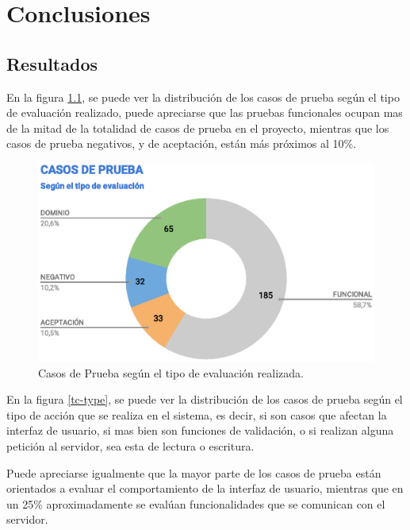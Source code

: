 \chapter{Conclusiones}

\section{Resultados}
En la figura \ref{tc-tests}, se puede ver la distribución de los casos de prueba
según el tipo de evaluación realizado, puede apreciarse que las pruebas
funcionales ocupan mas de la mitad de la totalidad de casos de prueba en el
proyecto, mientras que los casos de prueba negativos, y de aceptación, están más
próximos al 10\%.

\begin{figure}
\centering
\includegraphics[width=1.0\textwidth]{graphics/tc-tests.eps}
\caption{Casos de Prueba según el tipo de evaluación realizada.}
\label{tc-tests}
\end{figure}

En la figura \ref{tc-type}, se puede ver la distribución de los casos de prueba
según el tipo de acción que se realiza en el sistema, es decir, si son casos
que afectan la interfaz de usuario, si mas bien son funciones de validación, o
si realizan alguna petición al servidor, sea esta de lectura o escritura.

Puede apreciarse igualmente que la mayor parte de los casos de prueba están
orientados a evaluar el comportamiento de la interfaz de usuario, mientras que
en un 25\% aproximadamente se evalúan funcionalidades que se comunican con el
servidor.

